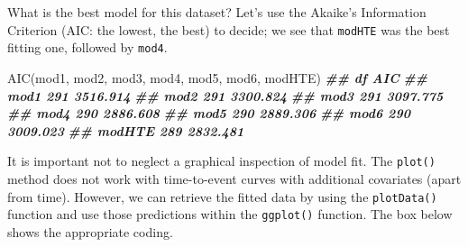 \documentclass[
]{book}
\newenvironment{Shaded}{\begin{snugshade}}{\end{snugshade}}
\newcommand{\AttributeTok}[1]{\textcolor[rgb]{0.77,0.63,0.00}{#1}}
\newcommand{\DocumentationTok}[1]{\textcolor[rgb]{0.56,0.35,0.01}{\textbf{\textit{#1}}}}
\newcommand{\FunctionTok}[1]{\textcolor[rgb]{0.00,0.00,0.00}{#1}}
\newcommand{\NormalTok}[1]{#1}
\newcommand{\OtherTok}[1]{\textcolor[rgb]{0.56,0.35,0.01}{#1}}
\newcommand{\SpecialCharTok}[1]{\textcolor[rgb]{0.00,0.00,0.00}{#1}}
\newcommand{\StringTok}[1]{\textcolor[rgb]{0.31,0.60,0.02}{#1}}
\begin{document}
What is the best model for this dataset? Let's use the Akaike's Information Criterion (AIC: the lowest, the best) to decide; we see that \texttt{modHTE} was the best fitting one, followed by \texttt{mod4}.

\begin{Shaded}
\begin{Highlighting}[]
\FunctionTok{AIC}\NormalTok{(mod1, mod2, mod3, mod4, mod5, mod6, modHTE)}
\DocumentationTok{\#\#         df      AIC}
\DocumentationTok{\#\# mod1   291 3516.914}
\DocumentationTok{\#\# mod2   291 3300.824}
\DocumentationTok{\#\# mod3   291 3097.775}
\DocumentationTok{\#\# mod4   290 2886.608}
\DocumentationTok{\#\# mod5   290 2889.306}
\DocumentationTok{\#\# mod6   290 3009.023}
\DocumentationTok{\#\# modHTE 289 2832.481}
\end{Highlighting}
\end{Shaded}

It is important not to neglect a graphical inspection of model fit. The \texttt{plot()} method does not work with time-to-event curves with additional covariates (apart from time). However, we can retrieve the fitted data by using the \texttt{plotData()} function and use those predictions within the \texttt{ggplot()} function. The box below shows the appropriate coding.

\begin{Shaded}
\end{Shaded}
\end{document}

